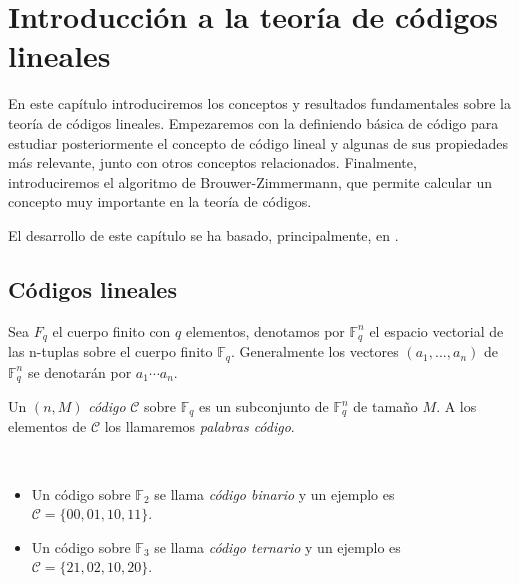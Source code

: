 
\chapter{Introducción a la teoría de códigos lineales}

En este capítulo introduciremos los conceptos y resultados fundamentales sobre la teoría de códigos lineales. Empezaremos con la definiendo básica de código para estudiar posteriormente el concepto de código lineal y algunas de sus propiedades más relevante, junto con otros conceptos relacionados. Finalmente, introduciremos el algoritmo de Brouwer-Zimmermann, que permite calcular un concepto muy importante en la teoría de códigos. 

El desarrollo de este capítulo se ha basado, principalmente, en \cite[Capítulo 1]{Huffman_Pless_2010}.

\section{Códigos lineales}

Sea $F_q$ el cuerpo finito con $q$ elementos, denotamos por $\mathbb{F}_q^n$ el espacio vectorial de las n-tuplas sobre el cuerpo finito $\mathbb{F}_q$. Generalmente los vectores $(a_1, ..., a_n)$ de $\mathbb{F}_q^n$ se denotarán por $a_1 \cdots a_n$.

\begin{definition}
    Un $(n, M)$ \emph{código} $\mathcal{C}$ sobre $\mathbb{F}_q$ es un subconjunto de 
    $\mathbb{F}_q^n$ de tamaño $M$. A los elementos de $\mathcal{C}$ los llamaremos \emph{palabras código}.
\end{definition}

\begin{exampleth}
    $ $
    \begin{itemize}
        \item Un código sobre $\mathbb{F}_2$ se llama \emph{código binario} y un ejemplo es $\mathcal{C} = \{00, 01, 10, 11\}$.
        \item Un código sobre $\mathbb{F}_3$ se llama \emph{código ternario} y un ejemplo es $\mathcal{C} = \{21, 02, 10, 20\}$.
    \end{itemize}
\end{exampleth}

